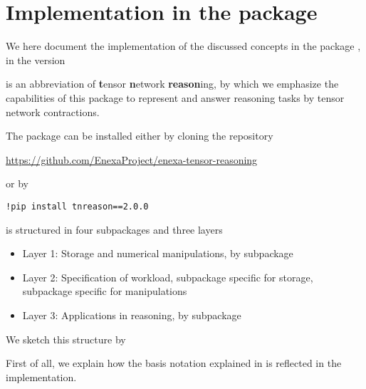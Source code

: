 \chapter{Implementation in the \tnreason{} package}\label{cha:implementation}

We here document the implementation of the discussed concepts in the \python{} package \tnreason{}, in the version \curvertnreason

\tnreason{} is an abbreviation of \textbf{t}ensor \textbf{n}etwork \textbf{reason}ing, by which we emphasize the capabilities of this package to represent and answer reasoning tasks by tensor network contractions.

The package can be installed either by cloning the repository
\begin{center}
    \href{https://github.com/EnexaProject/enexa-tensor-reasoning}{https://github.com/EnexaProject/enexa-tensor-reasoning}
\end{center}
or by
\begin{lstlisting}
!pip install tnreason==2.0.0
\end{lstlisting}


\tnreason{} is structured in four subpackages and three layers
\begin{itemize}
    \item Layer 1: Storage and numerical manipulations, by subpackage \spengine{}
    \item Layer 2: Specification of workload, subpackage \sprepresentation{} specific for storage, subpackage \spreasoning{} specific for manipulations
    \item Layer 3: Applications in reasoning, by subpackage \spapplication{}
\end{itemize}

We sketch this structure by
\begin{center}
    
\end{center}



First of all, we explain how the basis notation explained in  is reflected in the implementation.

